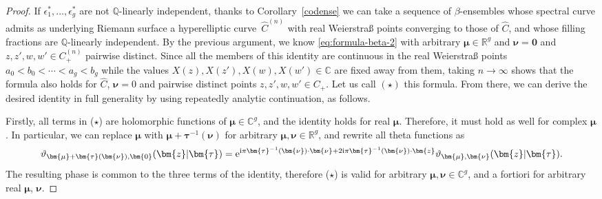 \documentclass[pdftex]{sigma}
\numberwithin{equation}{section}
\begin{document}
\begin{proof}
If $\epsilon_1^*,\ldots,\epsilon_g^*$ are not $\mathbb{Q}$-linearly independent, thanks to Corollary~\ref{codense} we can take a sequence of $\beta$-ensembles whose spectral curve admits as underlying Riemann surface a hyperelliptic curve~$\widehat{C}^{(n)}$ with real Weierstra\ss{} points converging to those of $\widehat{C}$, and whose filling fractions are $\mathbb{Q}$-linearly independent. By the previous argument, we know \eqref{eq:formula-beta-2} with arbitrary $\bm{\mu} \in \mathbb{R}^g$ and $\bm{\nu} = \bm{0}$ and $z,z',w,w' \in C^{(n)}_+$ pairwise distinct. Since all the members of this identity are continuous in the real Weierstra\ss{} points $a_0 < b_0 < \cdots < a_g < b_g$ while the values $X(z),X(z'),X(w),X(w') \in \mathbb{C}$ are fixed away from them, taking $n \rightarrow \infty$ shows that the formula also holds for $\widehat{C}$, $\bm{\nu} = 0$ and pairwise distinct points $z,z',w,w' \in C_+$. Let us call $(\star)$ this formula. From there, we can derive the desired identity in full generality by using repeatedly analytic continuation, as follows.



Firstly, all terms in ($\star$) are holomorphic functions of $\bm{\mu} \in \mathbb{C}^{g}$, and the identity holds for real $\bm{\mu}$. Therefore, it must hold as well for complex $\bm{\mu}$. In particular, we can replace $\bm{\mu}$ with $\bm{\mu} + \bm{\tau}^{-1}(\bm{\nu})$ for arbitrary $\bm{\mu},\bm{\nu} \in \mathbb{R}^{g}$, and rewrite all theta functions as
\[
\vartheta_{\bm{\mu} + \bm{\tau}(\bm{\nu}),\bm{0}}(\bm{z}|\bm{\tau}) ={\rm e}^{{\rm i}\pi\bm{\tau}^{-1}(\bm{\nu}) \cdot \bm{\nu} + 2{\rm i}\pi \bm{\tau}^{-1}(\bm{\nu}) \cdot \bm{z}} \vartheta_{\bm{\mu},\bm{\nu}}(\bm{z}|\bm{\tau}).
\]
The resulting phase is common to the three terms of the identity, therefore ($\star$) is valid for arbitrary $\bm{\mu},\bm{\nu} \in \mathbb{C}^{g}$, and a fortiori for arbitrary real $\bm{\mu}$, $\bm{\nu}$.


\end{proof}
\end{document}
